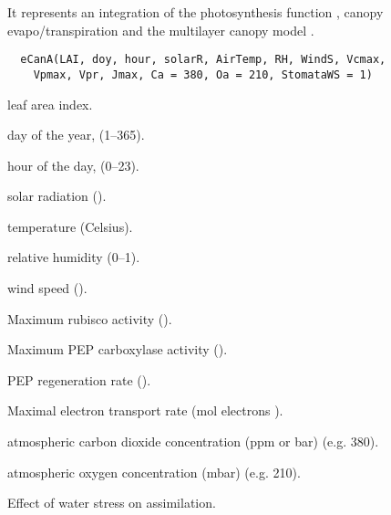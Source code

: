 \documentclass[letterpaper]{book}
\begin{document}
%
\begin{Description}\relax
It represents an integration of the photosynthesis
function , canopy
evapo/transpiration and the multilayer canopy model
.
\end{Description}
%
\begin{Usage}
\begin{verbatim}
  eCanA(LAI, doy, hour, solarR, AirTemp, RH, WindS, Vcmax,
    Vpmax, Vpr, Jmax, Ca = 380, Oa = 210, StomataWS = 1)
\end{verbatim}
\end{Usage}
%
\begin{Arguments}
\begin{ldescription}
\item[\code{LAI}] leaf area index.

\item[\code{doy}] day of the year, (1--365).

\item[\code{hour}] hour of the day, (0--23).

\item[\code{solarR}] solar radiation ().

\item[\code{AirTemp}] temperature (Celsius).

\item[\code{RH}] relative humidity (0--1).

\item[\code{WindS}] wind speed ().

\item[\code{Vcmax}] Maximum rubisco activity ().

\item[\code{Vpmax}] Maximum PEP carboxylase activity ().

\item[\code{Vpr}] PEP regeneration rate ().

\item[\code{Jmax}] Maximal electron transport rate
(\eqn{\mu}{}mol electrons 
).

\item[\code{Ca}] atmospheric carbon dioxide concentration (ppm
or \eqn{\mu}{}bar) (e.g. 380).

\item[\code{Oa}] atmospheric oxygen concentration (mbar) (e.g.
210).

\item[\code{StomataWS}] Effect of water stress on assimilation.
\end{ldescription}
\end{Arguments}
\end{document}

